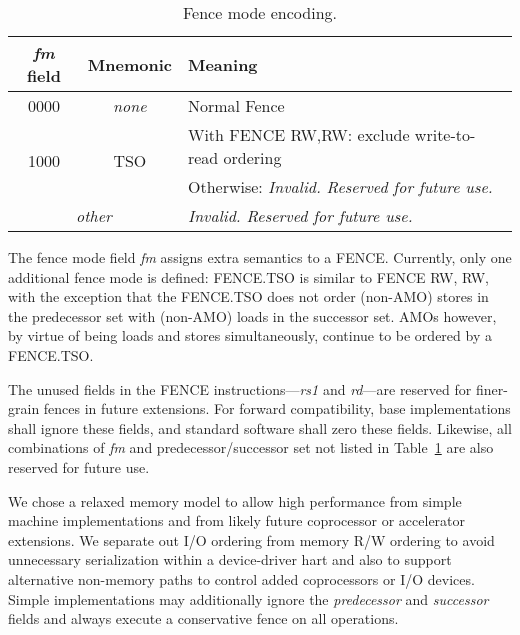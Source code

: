 \begin{table}[htp]
\begin{small}
\begin{center}
\begin{tabular}{|c|c|l|}
\hline
{\em fm} field & Mnemonic & Meaning \\
\hline
0000 & \em none & Normal Fence \\
\hline
\multirow{2}{*}{1000} & \multirow{2}{*}{TSO} & With FENCE RW,RW: exclude write-to-read ordering \\
                      &                      & Otherwise: \em Invalid.  Reserved for future use. \\
\hline
\multicolumn{2}{|c|}{\em other} & \em Invalid.  Reserved for future use. \\
\hline
\end{tabular}
\end{center}
\end{small}
\caption{Fence mode encoding.}
\label{fm}
\end{table}

The fence mode field {\em fm} assigns extra semantics to a FENCE.
Currently, only one additional fence mode is defined: FENCE.TSO is similar to FENCE RW, RW, with the exception that the FENCE.TSO does not order (non-AMO) stores in the predecessor set with (non-AMO) loads in the successor set.  AMOs however, by virtue of being loads and stores simultaneously, continue to be ordered by a FENCE.TSO.

The unused fields in the FENCE instructions---{\em rs1} and {\em rd}---are
reserved for finer-grain fences in future extensions.  For forward
compatibility, base implementations shall ignore these fields, and standard
software shall zero these fields.
Likewise, all combinations of {\em fm} and predecessor/successor set not listed in Table~\ref{fm} are also reserved for future use.

\begin{commentary}
We chose a relaxed memory model to allow high performance from simple
machine implementations and from likely future
coprocessor or accelerator extensions.  We separate out I/O ordering
from memory R/W ordering to avoid unnecessary serialization within a
device-driver hart and also to support alternative non-memory paths
to control added coprocessors or I/O devices.  Simple implementations
may additionally ignore the {\em predecessor} and {\em successor}
fields and always execute a conservative fence on all operations.
\end{commentary}

